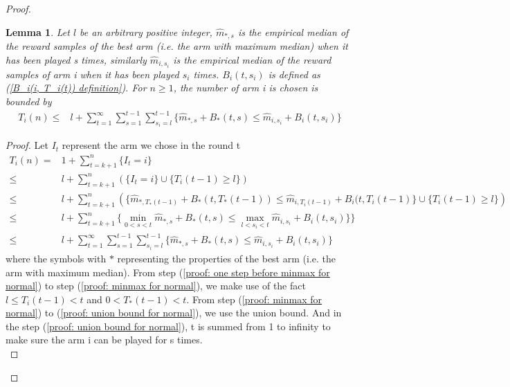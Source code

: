 \documentclass{article}
\theoremstyle{plain}
\newtheorem{lemma}{Lemma}
\begin{document}
\begin{proof}


\begin{lemma}
\label{Lemma 2 normal}
Let $l$ be an arbitrary positive integer, $\hat{m}_{*, s}$ is the empirical median of the reward samples of the best arm (i.e. the arm with maximum median) when it has been played s times, similarly $\hat{m}_{i, s_i}$ is the empirical median of the reward samples of arm i when it has been played $s_i$ times. $B_i(t, s_i)$ is defined as (\ref{B_i(i, T_i(t)) definition}). For $n \geq 1$, the number of arm i is chosen is bounded by
\begin{align}
    T_i(n) \leq & l + \sum_{t = 1}^\infty \sum_{s = 1}^{t-1} \sum_{s_i = l}^{t-1} \{\hat{m}_{*, s} + B_*(t, s)  \leq \hat{m}_{i, s_i} + B_i(t, s_i)\}
\end{align}
\end{lemma}
 
\begin{proof}
Let $I_t$ represent the arm we chose in the round t
    \begin{align}
        T_i(n) =& 1 + \sum_{t = k + 1}^n \{I_t = i\}\\
       \leq & l + \sum_{t = k + 1}^n (\{I_t = i\} \cup \{T_i(t-1) \geq l\})\\
       \label{proof: one step before minmax for normal}
       \leq & l + \sum_{t = k + 1}^n \left(\{ \hat{m}_{*, T_*(t-1)} + B_*(t, T_*(t-1)) \leq \hat{m}_{i, T_i(t-1)} + B_i(t, T_i(t-1)\} \cup \{ T_i(t-1) \geq l\}\right)\\
       \label{proof: minmax for normal}
       \leq & l + \sum_{t = k + 1}^n \{ \mathop{min}\limits_{0 < s < t}\hat{m}_{*, s} + B_*(t, s) \leq \mathop{max}\limits_{l < s_i < t}\hat{m}_{i, s_i} + B_i(t, s_i)\}\}\\
       \label{proof: union bound for normal}
       \leq & l + \sum_{t = 1}^\infty \sum_{s = 1}^{t-1} \sum_{s_i = l}^{t-1} \{\hat{m}_{*, s} + B_*(t, s)  \leq \hat{m}_{i, s_i} + B_i(t, s_i)\}
    \end{align}
    where the symbols with $*$ representing the properties of the best arm (i.e. the arm with maximum median). From step (\ref{proof: one step before minmax for normal}) to step (\ref{proof: minmax for normal}), we make use of the fact $l \leq T_i(t-1) < t$ and $0 < T_*(t-1) < t$. From step (\ref{proof: minmax for normal}) to (\ref{proof: union bound for normal}), we use the union bound. And in the step (\ref{proof: union bound for normal}), t is summed from 1 to infinity to make sure the arm i can be played for s times.\\
\end{proof}


\end{proof}
\end{document}
